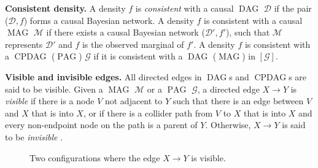 \documentclass[]{article}
\DeclareMathOperator{\CPDAG}{CPDAG}
\DeclareMathOperator{\DAG}{DAG}
\DeclareMathOperator{\MAG}{MAG}
\DeclareMathOperator{\PAG}{PAG}
\theoremstyle{definition}
\theoremstyle{remark}
\newcommand{\g}[1][G]{\mathcal{#1}}
\begin{document}
\textbf{Consistent density.} A density $f$ is \textit{consistent} with a causal $\DAG$ $\g[D]$ if the pair ($\g[D],f$) forms a causal Bayesian network. A density $f$ is consistent with a causal $\MAG$ $\g[M]$ if there exists a causal Bayesian network ($\g[D]',f'$), such that $\g[M]$ represents $\g[D]'$ and $f$ is the observed marginal of $f'$. A density $f$ is consistent with a $\CPDAG$ ($\PAG$) $\g$ if it is consistent with a $\DAG$ ($\MAG$) in $[\g]$.

\textbf{Visible and invisible edges.}
All directed edges in $\DAG$s and $\CPDAG$s are said to be visible. Given a $\MAG$ $\g[M]$ or a $\PAG$ $\g$, a directed edge $X \rightarrow Y$ is \textit{visible} if there is a node $V$ not adjacent to $Y$ such that there is an edge between $V$ and $X$ that is into $X$, or if there is a collider path from $V$ to $X$ that is into $X$ and every non-endpoint node on the path is a parent of $Y$. Otherwise, $X \rightarrow Y$ is said to be \textit{invisible} \citep{zhang2006causal, maathuis2013generalized}.


\begin{figure}[!tbp]
\centering
\begin{subfigure}{.15\textwidth}
  \centering
  \label{visible:sub1}
\end{subfigure}%
\unskip
\vrule
\begin{subfigure}{.3\textwidth}
  \centering
  \label{visible:sub2}
\end{subfigure}
\caption{Two configurations where the edge $X \rightarrow Y$ is visible.}
\label{fig:visible}
\end{figure}
\end{document}
